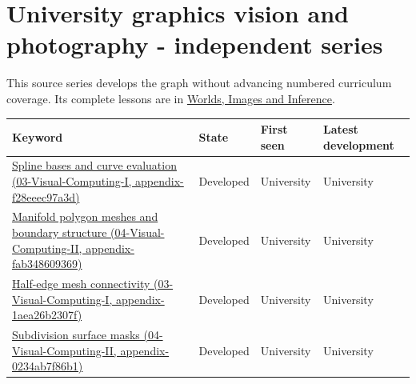 \section{University graphics vision and photography - independent series}\label{appendix-a6d556a4ef50-university-graphics-vision-and-photography---independent-series}

This source series develops the graph without advancing numbered curriculum coverage. Its complete lessons are in \href{Continuous\%20Notes/University\%20-\%20Worlds,\%20Images\%20and\%20Inference\%20-\%20Graphics,\%20Vision\%20and\%20Photography}{Worlds, Images and Inference}.

{\def\LTcaptype{none} %
\begin{longtable}[]{@{}
  >{\raggedright\arraybackslash}p{}
  >{\raggedright\arraybackslash}p{}
  >{\raggedright\arraybackslash}p{}
  >{\raggedright\arraybackslash}p{}@{}}
\toprule\noalign{}
\begin{minipage}[b]{\linewidth}\raggedright
Keyword
\end{minipage} & \begin{minipage}[b]{\linewidth}\raggedright
State
\end{minipage} & \begin{minipage}[b]{\linewidth}\raggedright
First seen
\end{minipage} & \begin{minipage}[b]{\linewidth}\raggedright
Latest development
\end{minipage} \\
\midrule\noalign{}
\endhead
\bottomrule\noalign{}
\endlastfoot
\href{../03-Visual-Computing-I/main.pdf\#nameddest=appendix-f28eeec97a3d}{Spline bases and curve evaluation (03-Visual-Computing-I, appendix-f28eeec97a3d)} & Developed & University & University \\
\href{../04-Visual-Computing-II/main.pdf\#nameddest=appendix-fab348609369}{Manifold polygon meshes and boundary structure (04-Visual-Computing-II, appendix-fab348609369)} & Developed & University & University \\
\href{../03-Visual-Computing-I/main.pdf\#nameddest=appendix-1aea26b2307f}{Half-edge mesh connectivity (03-Visual-Computing-I, appendix-1aea26b2307f)} & Developed & University & University \\
\href{../04-Visual-Computing-II/main.pdf\#nameddest=appendix-0234ab7f86b1}{Subdivision surface masks (04-Visual-Computing-II, appendix-0234ab7f86b1)} & Developed & University & University \\

\end{longtable}}
